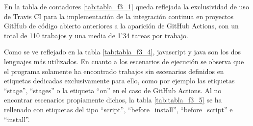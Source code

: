 En la tabla de contadores \ref{tab:tabla_f3_1} queda reflejada la exclusividad de uso de Travis CI para la implementación de la integración continua en proyectos GitHub de código abierto anteriores a la aparición de GitHub Actions, con un total de 110 trabajos y una media de 1'34 tareas por trabajo.

Como se ve reflejado en la tabla \ref{tab:tabla_f3_4}, javascript y java son los dos lenguajes más utilizados. En cuanto a los escenarios de ejecución se observa que el programa solamente ha encontrado trabajos sin escenarios definidos en etiquetas dedicadas exclusivamente para ello, como por ejemplo las etiquetas ``stage'', ``stages'' o la etiqueta ``on'' en el caso de GitHub Actions. Al no encontrar escenarios propiamente dichos, la tabla \ref{tab:tabla_f3_5} se ha rellenado con etiquetas del tipo ``script'', ``before\_install'', ``before\_script'' e ``install''.